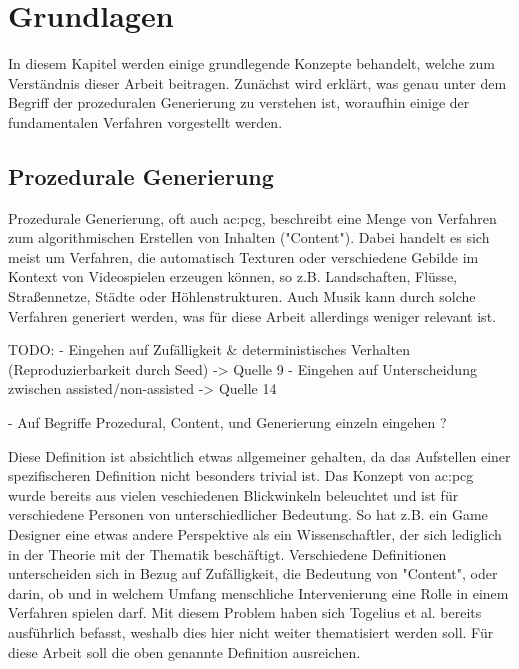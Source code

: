 %
\chapter{Grundlagen}
In diesem Kapitel werden einige grundlegende Konzepte behandelt, welche zum Verständnis dieser Arbeit beitragen. Zunächst wird
erklärt, was genau unter dem Begriff der prozeduralen Generierung zu verstehen ist, woraufhin einige der fundamentalen Verfahren
vorgestellt werden.

\section{Prozedurale Generierung}
Prozedurale Generierung, oft auch \gls{ac:pcg}, beschreibt eine Menge von Verfahren zum
algorithmischen Erstellen von Inhalten ("Content"). Dabei handelt es sich meist um Verfahren, die automatisch Texturen
oder verschiedene Gebilde im Kontext von Videospielen erzeugen können, so z.B. Landschaften, Flüsse, Straßennetze,
Städte oder Höhlenstrukturen. Auch Musik kann durch solche Verfahren generiert werden, was für diese Arbeit allerdings
weniger relevant ist. \cite{9_togelius_et_al}

TODO:
- Eingehen auf Zufälligkeit \& deterministisches Verhalten (Reproduzierbarkeit durch Seed) -> Quelle 9
- Eingehen auf Unterscheidung zwischen assisted/non-assisted -> Quelle 14

- Auf Begriffe Prozedural, Content, und Generierung einzeln eingehen ?

Diese Definition ist absichtlich etwas allgemeiner gehalten, da das Aufstellen einer spezifischeren Definition nicht
besonders trivial ist. Das Konzept von \gls{ac:pcg} wurde bereits aus vielen veschiedenen Blickwinkeln beleuchtet und ist für verschiedene
Personen von unterschiedlicher Bedeutung. So hat z.B. ein Game Designer eine etwas andere Perspektive als ein Wissenschaftler, der
sich lediglich in der Theorie mit der Thematik beschäftigt. Verschiedene Definitionen unterscheiden sich in Bezug auf
Zufälligkeit, die Bedeutung von "Content", oder darin, ob und in welchem Umfang menschliche Intervenierung eine Rolle in einem
Verfahren spielen darf. Mit diesem Problem haben sich Togelius et al. \cite{9_togelius_et_al} bereits ausführlich befasst, weshalb dies hier
nicht weiter thematisiert werden soll. Für diese Arbeit soll die oben genannte Definition ausreichen.

